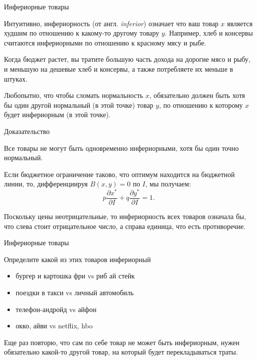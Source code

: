 \documentclass{beamer}
\begin{document}
\begin{frame}{Инфериорные товары}

Интуитивно, инфериорность (от англ. \textit{inferior}) означает что ваш товар $x$ является худшим по отношению к какому-то другому товару $y$. Например, хлеб и консервы считаются инфериорными по отношению к красному мясу и рыбе. 

Когда бюджет растет, вы тратите большую часть дохода на дорогие мясо и рыбу, и меньшую на дешевые хлеб и консервы, а также потребляете их меньше в штуках. 

Любопытно, что чтобы сломать нормальность $x$, обязательно должен быть хотя бы один другой нормальный (в этой точке) товар $y$, по отношению к которому $x$ будет инфериорным (в этой точке).

\end{frame}

\begin{frame}{Доказательство}

\begin{lemma}
Все товары не могут быть одновременно инфериорными, хотя бы один точно нормальный.
\end{lemma}

Если бюджетное ограничение таково, что оптимум находится на бюджетной линии, то, дифференциируя $B(x,y)= 0$ по $I$, мы получаем: 
$$ p \frac{\partial x^{\ast}}{\partial I}  + q \frac{\partial y^{\ast}}{\partial I}  = 1.$$ 

Поскольку цены неотрицательные, то инфериорность всех товаров означала бы, что слева стоит отрицательное число, а справа единица, что есть противоречие.

\end{frame}

\begin{frame}{Инфериорные товары}

Определите какой из этих товаров инфериорный

\begin{itemize}
  \item бургер и картошка фри vs риб ай стейк
  \item поездки в такси vs личный автомобиль
  \item телефон-андройд vs айфон
  \item окко, айви vs netflix, hbo
\end{itemize}

Еще раз повторю, что сам по себе товар не может быть инфериорным, нужен обязательно какой-то другой товар, на который будет перекладываться траты. 

\end{frame}
\end{document}
